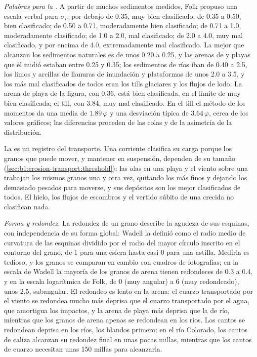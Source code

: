 \emph{Palabras para la .} A partir de muchos sedimentos medidos, Folk propuso una escala verbal para $\sigma_I$: por debajo de \num{0.35}, muy bien clasificado;
de \num{0.35} a \num{0.50}, bien clasificado; de \num{0.50} a \num{0.71}, moderadamente bien clasificado; de \num{0.71} a \num{1.0}, moderadamente clasificado; de \num{1.0}
a \num{2.0}, mal clasificado; de \num{2.0} a \num{4.0}, muy mal clasificado, y por encima de \num{4.0}, extremadamente mal clasificado. La mejor  que alcanzan
los sedimentos naturales es de unos \num{0.20} a \num{0.25}, y las arenas de  y playas que él midió estaban entre \num{0.25} y \num{0.35}; los sedimentos de ríos
iban de \num{0.40} a \num{2.5}, los limos y arcillas de llanuras de inundación y plataformas de unos \num{2.0} a \num{3.5}, y los más mal clasificados de todos eran los
tills glaciares y los flujos de lodo. La arena de playa de la figura, con \num{0.36}, está bien clasificada, en el límite de muy bien clasificada; el till, con
\num{3.84}, muy mal clasificado. En el till el método de los momentos da una media de $1.89\,\varphi$ y una desviación típica de $3.64\,\varphi$, cerca de los valores
gráficos; las diferencias proceden de las colas y de la asimetría de la distribución.

La  es un registro del transporte. Una corriente clasifica su carga porque los granos que puede mover, y mantener en suspensión, dependen de su tamaño
(\cref{sec:b1:erosion-transport:threshold}): las olas en una playa y el viento sobre una  trabajan los mismos granos una y otra vez, quitando los más finos y dejando
los demasiado pesados para moverse, y sus depósitos son los mejor clasificados de todos. El hielo, los flujos de escombros y el vertido súbito de una crecida no clasifican nada.

\emph{Forma y redondez.} La redondez de un grano describe la agudeza de sus esquinas, con independencia de su forma global: Wadell la definió como el radio medio de
curvatura de las esquinas dividido por el radio del mayor círculo inscrito en el contorno del grano, de 1 para una esfera hasta casi 0 para una astilla. Medirla es
tedioso, y los granos se comparan en cambio con cuadros de fotografías; en la escala de Wadell la mayoría de los granos de arena tienen redondeces de \num{0.3} a \num{0.4},
y en la escala logarítmica de Folk, de 0 (muy angular) a 6 (muy redondeado), unos \num{2.5}, subangular. El redondeo es lento en la arena: el cuarzo transportado por el viento
se redondea mucho más deprisa que el cuarzo transportado por el agua, que amortigua los impactos, y la arena de playa más deprisa que la de río, mientras que los granos de arena
apenas se redondean en los ríos. Los cantos se redondean deprisa en los ríos, los blandos primero: en el río Colorado, los cantos de caliza alcanzan su redondez final en unas
pocas millas, mientras que los cantos de cuarzo necesitan unas \num{150} millas para alcanzarla.

